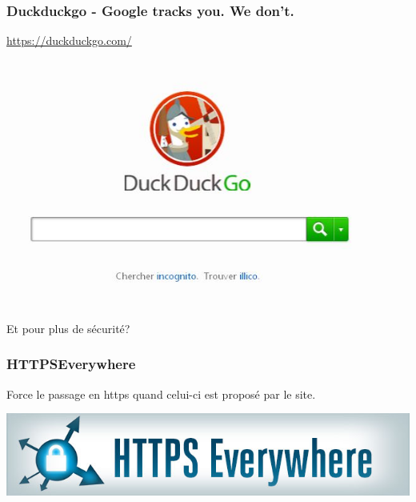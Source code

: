 \begin{frame}
\begin{center}
\frametitle{Duckduckgo - Google tracks you. We don't.}

\url{https://duckduckgo.com/}
\\
\includegraphics[scale=0.4] {./materials/DuckDuckGo.jpg}
\end{center}
\end{frame}

\begin{frame}
\begin{center}
\Huge{Et pour plus de sécurité?}
\end{center}
\end{frame}

\begin{frame}
\frametitle{HTTPSEverywhere}

Force le passage en https quand celui-ci est proposé par le site.

\begin{center}
\includegraphics[scale=0.4] {./materials/https-everywhere.jpg}
\end{center}

\end{frame}

